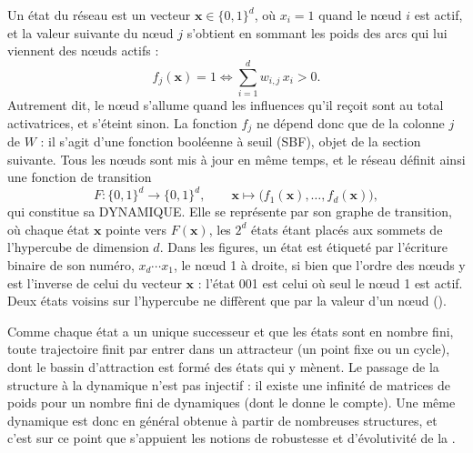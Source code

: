 \documentclass[12pt, a4paper]{article}
\begin{document}
Un état du réseau est un vecteur $\mathbf{x} \in \{0,1\}^d$, où $x_i = 1$ quand le nœud $i$ est actif, et la valeur suivante du nœud $j$ s'obtient en sommant les poids des arcs qui lui viennent des nœuds actifs :
\begin{equation}
f_j(\mathbf{x}) = 1 \iff \sum_{i=1}^{d} w_{i,j}\, x_i > 0 .
\end{equation}
Autrement dit, le nœud s'allume quand les influences qu'il reçoit sont au total activatrices, et s'éteint sinon.
La fonction $f_j$ ne dépend donc que de la colonne $j$ de $W$ : il s'agit d'une fonction booléenne à seuil (SBF), objet de la section suivante.
Tous les nœuds sont mis à jour en même temps, et le réseau définit ainsi une fonction de transition
\begin{equation}
F : \{0,1\}^d \to \{0,1\}^d, \qquad \mathbf{x} \mapsto \big(f_1(\mathbf{x}), \dots, f_d(\mathbf{x})\big),
\end{equation}
qui constitue sa DYNAMIQUE.
Elle se représente par son graphe de transition, où chaque état $\mathbf{x}$ pointe vers $F(\mathbf{x})$, les $2^d$ états étant placés aux sommets de l'hypercube de dimension $d$.
Dans les figures, un état est étiqueté par l'écriture binaire de son numéro, $x_d \cdots x_1$, le nœud 1 à droite, si bien que l'ordre des nœuds y est l'inverse de celui du vecteur $\mathbf{x}$ : l'état 001 est celui où seul le nœud 1 est actif.
Deux états voisins sur l'hypercube ne diffèrent que par la valeur d'un nœud ().

Comme chaque état a un unique successeur et que les états sont en nombre fini, toute trajectoire finit par entrer dans un attracteur (un point fixe ou un cycle), dont le bassin d'attraction est formé des états qui y mènent.
Le passage de la structure à la dynamique n'est pas injectif : il existe une infinité de matrices de poids pour un nombre fini de dynamiques (dont le  donne le compte).
Une même dynamique est donc en général obtenue à partir de nombreuses structures, et c'est sur ce point que s'appuient les notions de robustesse et d'évolutivité de la .
\end{document}
